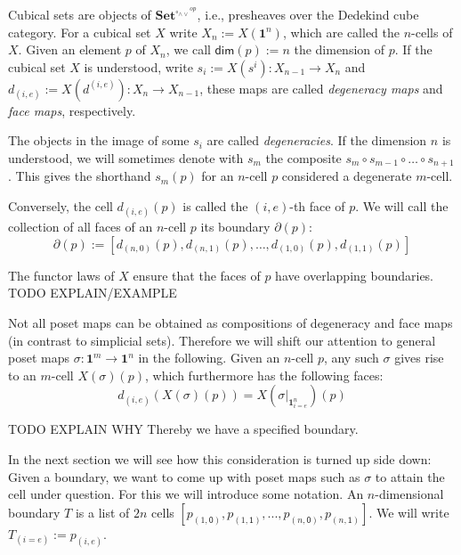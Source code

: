 \documentclass[11pt]{article}
\theoremstyle{definition}
\newcommand{\mdef}{:=}
\newcommand{\mname}[1]{\textit{{#1}}}
\newcommand{\mlist}[1]{[ {#1} ]}
\newcommand{\join}{\wedge}
\newcommand{\meet}{\vee}
\newcommand{\dedekind}{\square_{\join \meet}}
\newcommand{\pint}[1]{\mathbf{1}^{#1}}
\newcommand{\pintrestr}[3]{\mathbf{1}^{#1}_{{#2}={#3}}}
\newcommand{\izero}{\mathsf{0}}
\newcommand{\ione}{\mathsf{1}}
\newcommand{\restrict}[2]{{#1}|_{#2}}
\newcommand{\psh}[1]{\mathbf{Set}^{{#1}^{op}}}
\renewcommand{\dim}[1]{\mathsf{dim}({#1})}
\newcommand{\smap}[1]{s_{{#1}}}
\newcommand{\dmap}[2]{d_{({#1} , {#2})}}
\newcommand{\boundary}[1]{\partial({#1})}
\begin{document}
Cubical sets are objects of $\psh{\dedekind}$, i.e., presheaves over the
Dedekind cube category. For a cubical set $X$ write $X_n \mdef X(\pint{n})$,
which are called the $n$-cells of $X$. Given an element $p$ of $X_n$, we call
$\dim{p} \mdef n$ the dimension of $p$. If the cubical set $X$ is understood,
write $\smap{i} \mdef X(s^i) : X_{n-1} \to X_n$ and $\dmap{i}{e} \mdef
X(d^{(i,e)}) : X_n \to X_{n-1}$, these maps are called \mname{degeneracy maps}
and \mname{face maps}, respectively.

The objects in the image of some $\smap{i}$ are called \mname{degeneracies}. If
the dimension $n$ is understood, we will sometimes denote with $\smap{m}$ the
composite $\smap{m} \circ \smap{m-1} \circ \ldots \circ \smap{n+1}$. This gives
the shorthand $\smap{m}(p)$ for an $n$-cell $p$ considered a degenerate
$m$-cell.

Conversely, the cell $\dmap{i}{e}(p)$ is called the $(i,e)$-th face of $p$. We
will call the collection of all faces of an $n$-cell $p$ its boundary $\boundary{p}$:
$$\boundary{p} \mdef \mlist{ \dmap{n}{0}(p), \dmap{n}{1}(p) , \ldots , \dmap{1}{0}(p), \dmap{1}{1}(p)}$$

The functor laws of $X$ ensure that the faces of $p$ have overlapping
boundaries. TODO EXPLAIN/EXAMPLE


Not all poset maps can be obtained as compositions of degeneracy and face maps
(in contrast to simplicial sets). Therefore we will shift our attention to
general poset maps $\sigma : \pint{m} \to \pint{n}$ in the following. 
Given an $n$-cell $p$, any such $\sigma$ gives rise to an $m$-cell
$X(\sigma)(p)$, which furthermore has the following faces:
$$\dmap{i}{e}(X(\sigma)(p)) = X(\restrict{\sigma}{\pintrestr{n}{i}{e}})(p)$$

TODO EXPLAIN WHY
Thereby we have a specified boundary.

In the next section we will see how this consideration is turned up side down:
Given a boundary, we want to come up with poset maps such as $\sigma$ to attain
the cell under question. For this we will introduce some notation. An
$n$-dimensional boundary $T$ is a list of $2n$ cells $\mlist{p_{(1,\izero)},
  p_{(1,\ione)} , ... , p_{(n,\izero)}, p_{(n, \ione)}}$. We will write
$T_{(i=e)} \mdef p_{(i,e)}$.
\end{document}
